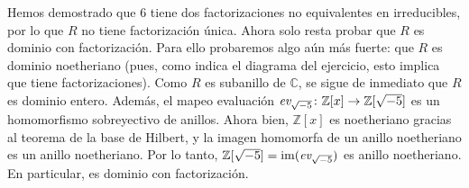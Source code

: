 \begin{sol}
\begin{enumerate}[label={\bfseries\Roman*}., wide, itemsep=1em]
Hemos demostrado que $6$ tiene dos factorizaciones no equivalentes en irreducibles, por lo que $R$ no tiene factorización única. Ahora solo resta probar que $R$ es dominio con factorización. Para ello probaremos algo aún más fuerte: que $R$ es dominio noetheriano (pues, como indica el diagrama del ejercicio, esto implica que tiene factorizaciones). Como $R$ es subanillo de $\mathbb{C}$, se sigue de inmediato que $R$ es dominio entero. Además, el mapeo evaluación $\operatorname{\textit{ev}}_{\sqrt{-5}} \colon \mathbb{Z}[x] \to \mathbb{Z}[\sqrt{-5}]$ es un homomorfismo sobreyectivo de anillos. Ahora bien, $\mathbb{Z}[x]$ es noetheriano gracias al teorema de la base de Hilbert, y la imagen homomorfa de un anillo noetheriano es un anillo noetheriano. Por lo tanto, $\mathbb{Z}[\sqrt{-5}] = \operatorname{im}(\operatorname{\textit{ev}}_{\sqrt{-5}})$ es anillo noetheriano. En particular, es dominio con factorización.


\end{enumerate}
\end{sol}
